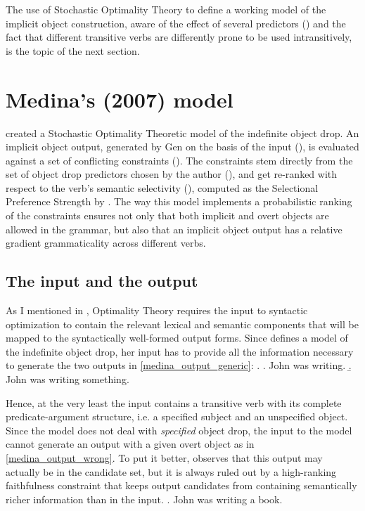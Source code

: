 The use of Stochastic Optimality Theory to define a working model of the implicit object construction, aware of the effect of several predictors () and the fact that different transitive verbs are differently prone to be used intransitively, is the topic of the next section.

\section{Medina's (2007) model} 

\textcite{Medina2007} created a Stochastic Optimality Theoretic model of the indefinite object drop. An implicit object output, generated by Gen on the basis of the input (), is evaluated against a set of conflicting constraints (). The constraints stem directly from the set of object drop predictors chosen by the author (), and get re-ranked with respect to the verb's semantic selectivity (), computed as the Selectional Preference Strength by \textcite{Resnik1993, Resnik1996}. The way this model implements a probabilistic ranking of the constraints ensures not only that both implicit and overt objects are allowed in the grammar, but also that an implicit object output has a relative gradient grammaticality across different verbs.


\subsection{The input and the output} 

As I mentioned in , Optimality Theory requires the input to syntactic optimization to contain the relevant lexical and semantic components that will be mapped to the syntactically well-formed output forms. Since \textcite{Medina2007} defines a model of the indefinite object drop, her input has to provide all the information necessary to generate the two outputs in  \ref{medina_output_generic}:
\ex. \label{medina_output_generic} \a. John was writing.
\b. John was writing something.

Hence, at the very least the input contains a transitive verb with its complete predicate-argument structure, i.e. a specified subject and an unspecified object. Since the model does not deal with \textit{specified} object drop, the input to the model cannot generate an output with a given overt object as in \ref{medina_output_wrong}. To put it better, \textcite[70-71]{Medina2007} observes that this output may actually be in the candidate set, but it is always ruled out by a high-ranking faithfulness constraint that keeps output candidates from containing semantically richer information than in the input.
\ex. \label{medina_output_wrong} John was writing a book.

